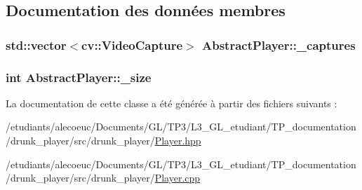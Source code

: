 \subsection{Documentation des données membres}
\hypertarget{classAbstractPlayer_a72dd2ef25310decd45671a7d51e1f319}{
\subsubsection[{\+\_\+captures}]{\setlength{\rightskip}{0pt plus 5cm}std\+::vector$<$cv\+::\+Video\+Capture$>$ Abstract\+Player\+::\+\_\+captures\hspace{0.3cm}{\ttfamily [protected]}}}\label{classAbstractPlayer_a72dd2ef25310decd45671a7d51e1f319}
\hypertarget{classAbstractPlayer_a9d8395a141cc985622d4910209bc7d53}{
\subsubsection[{\+\_\+size}]{\setlength{\rightskip}{0pt plus 5cm}int Abstract\+Player\+::\+\_\+size\hspace{0.3cm}{\ttfamily [protected]}}}\label{classAbstractPlayer_a9d8395a141cc985622d4910209bc7d53}


La documentation de cette classe a été générée à partir des fichiers suivants \+:\begin{DoxyCompactItemize}
\item 
/etudiants/alecoeuc/\+Documents/\+G\+L/\+T\+P3/\+L3\+\_\+\+G\+L\+\_\+etudiant/\+T\+P\+\_\+documentation/drunk\+\_\+player/src/drunk\+\_\+player/\hyperlink{Player_8hpp}{Player.\+hpp}\item 
/etudiants/alecoeuc/\+Documents/\+G\+L/\+T\+P3/\+L3\+\_\+\+G\+L\+\_\+etudiant/\+T\+P\+\_\+documentation/drunk\+\_\+player/src/drunk\+\_\+player/\hyperlink{Player_8cpp}{Player.\+cpp}\end{DoxyCompactItemize}
